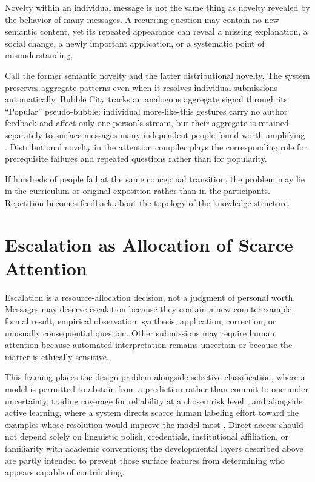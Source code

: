\documentclass[11pt]{article}
\begin{document}
Novelty within an individual message is not the same thing as novelty revealed by the behavior of many messages. A recurring question may contain no new semantic content, yet its repeated appearance can reveal a missing explanation, a social change, a newly important application, or a systematic point of misunderstanding.

Call the former semantic novelty and the latter distributional novelty. The system preserves aggregate patterns even when it resolves individual submissions automatically. Bubble City tracks an analogous aggregate signal through its ``Popular'' pseudo-bubble: individual more-like-this gestures carry no author feedback and affect only one person's stream, but their aggregate is retained separately to surface messages many independent people found worth amplifying \cite{anderson2022bubblecity}. Distributional novelty in the attention compiler plays the corresponding role for prerequisite failures and repeated questions rather than for popularity.

If hundreds of people fail at the same conceptual transition, the problem may lie in the curriculum or original exposition rather than in the participants. Repetition becomes feedback about the topology of the knowledge structure.

\section{Escalation as Allocation of Scarce Attention}

Escalation is a resource-allocation decision, not a judgment of personal worth. Messages may deserve escalation because they contain a new counterexample, formal result, empirical observation, synthesis, application, correction, or unusually consequential question. Other submissions may require human attention because automated interpretation remains uncertain or because the matter is ethically sensitive.

This framing places the design problem alongside selective classification, where a model is permitted to abstain from a prediction rather than commit to one under uncertainty, trading coverage for reliability at a chosen risk level \cite{geifman2017}, and alongside active learning, where a system directs scarce human labeling effort toward the examples whose resolution would improve the model most \cite{settles2009}. Direct access should not depend solely on linguistic polish, credentials, institutional affiliation, or familiarity with academic conventions; the developmental layers described above are partly intended to prevent those surface features from determining who appears capable of contributing.
\end{document}
